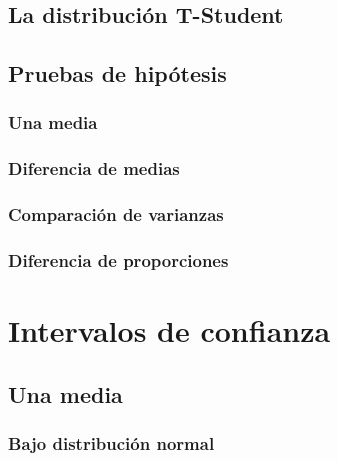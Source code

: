 \documentclass[
]{book}
\begin{document}
\hypertarget{la-distribuciuxf3n-t-student}{%
\section{La distribución T-Student}\label{la-distribuciuxf3n-t-student}}

\hypertarget{pruebas-de-hipuxf3tesis}{%
\section{Pruebas de hipótesis}\label{pruebas-de-hipuxf3tesis}}

\hypertarget{una-media}{%
\subsection{Una media}\label{una-media}}

\hypertarget{diferencia-de-medias}{%
\subsection{Diferencia de medias}\label{diferencia-de-medias}}

\hypertarget{comparaciuxf3n-de-varianzas}{%
\subsection{Comparación de varianzas}\label{comparaciuxf3n-de-varianzas}}

\hypertarget{diferencia-de-proporciones}{%
\subsection{Diferencia de proporciones}\label{diferencia-de-proporciones}}

\hypertarget{intervalos-de-confianza}{%
\chapter{Intervalos de confianza}\label{intervalos-de-confianza}}

\hypertarget{una-media-1}{%
\section{Una media}\label{una-media-1}}

\hypertarget{bajo-distribuciuxf3n-normal}{%
\subsection{Bajo distribución normal}\label{bajo-distribuciuxf3n-normal}}
\end{document}
